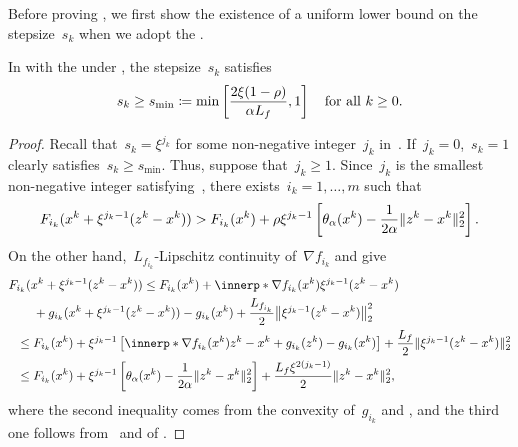 \documentclass[../../main]{subfiles}
\begin{document}
Before proving , we first show the existence of a uniform lower bound on the stepsize~$s_k$ when we adopt the .
\begin{lemma} 
    In  with the  under , the stepsize~$s_k$ satisfies
    \begin{equation}
        s_k \ge s_{\min} \coloneqq \min \left[\frac{2 \xi (1 - \rho)}{\alpha L_f}, 1\right] \quad \text{for all~$k \ge 0$}
    .\end{equation} 
\end{lemma}
\begin{proof}
    Recall that~$s_k = \xi^{j_k}$ for some non-negative integer~$j_k$ in~.
    If~$j_k = 0$,~$s_k = 1$ clearly satisfies~$s_k \ge s_{\min}$.
    Thus, suppose that~$j_k \ge 1$.
    Since~$j_k$ is the smallest non-negative integer satisfying~, there exists~$i_k = 1, \dots, m$ such that
    \begin{equation}
        F_{i_k}(x^k + \xi^{j_k - 1} (z^k - x^k)) > F_{i_k}(x^k) + \rho \xi^{j_k - 1} \left[ \theta_\alpha(x^k) - \frac{1}{2\alpha} \lVert z^k - x^k\rVert_2^2 \right]
    .\end{equation} 
    On the other hand,~$L_{f_{i_k}}$-Lipschitz continuity of~$\nabla f_{i_k}$ and  give
    \begin{align}
        \MoveEqLeft F_{i_k}(x^k + \xi^{j_k - 1} (z^k - x^k)) \le F_{i_k}(x^k) + \innerp*{\nabla f_{i_k}(x^k)}{\xi^{j_k - 1} (z^k - x^k)} \\
        &+ g_{i_k}(x^k + \xi^{j_k - 1} (z^k - x^k)) - g_{i_k}(x^k) + \frac{L_{f_{i_k}}}{2} \norm*{\xi^{j_k - 1} (z^k - x^k)}_2^2 \\
        \le{}& F_{i_k}(x^k) + \xi^{j_k - 1} \left[ \innerp*{\nabla f_{i_k}(x^k)}{z^k - x^k} + g_{i_k}(z^k) - g_{i_k}(x^k) \right] + \frac{L_f}{2} \norm{\xi^{j_k - 1} (z^k - x^k)}_2^2 \\
    \le{}& F_{i_k}(x^k) + \xi^{j_k - 1} \left[ \theta_\alpha(x^k) - \frac{1}{2 \alpha} \norm{z^k - x^k}_2^2 \right] + \frac{L_f \xi^{2 (j_k - 1)}}{2} \norm{z^k - x^k}_2^2
    ,\end{align}
    where the second inequality comes from the convexity of~$g_{i_k}$ and , and the third one follows from~ and  of .

\end{proof}
\end{document}
